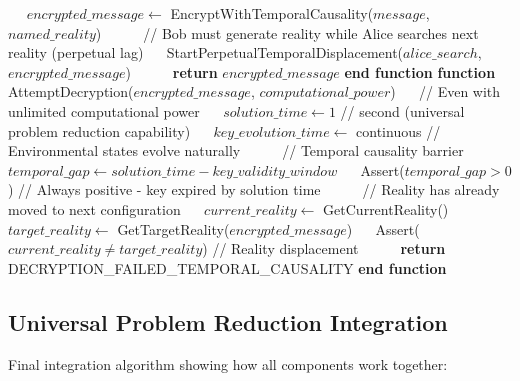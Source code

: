 \documentclass[12pt,a4paper]{article}
\theoremstyle{definition}
\begin{document}
{\begin{algorithm}
\begin{algorithmic}[1]
\STATE $\quad$ $encrypted\_message \leftarrow$ EncryptWithTemporalCausality($message$, $named\_reality$)
\STATE $\quad$
\STATE $\quad$ // Bob must generate reality while Alice searches next reality (perpetual lag)
\STATE $\quad$ StartPerpetualTemporalDisplacement($alice\_search$, $encrypted\_message$)
\STATE $\quad$
\STATE $\quad$ \textbf{return} $encrypted\_message$
\STATE \textbf{end function}
\STATE
\STATE \textbf{function} AttemptDecryption($encrypted\_message$, $computational\_power$)
\STATE $\quad$ // Even with unlimited computational power
\STATE $\quad$ $solution\_time \leftarrow 1$ // second (universal problem reduction capability)
\STATE $\quad$ $key\_evolution\_time \leftarrow$ continuous // Environmental states evolve naturally
\STATE $\quad$
\STATE $\quad$ // Temporal causality barrier
\STATE $\quad$ $temporal\_gap \leftarrow solution\_time - key\_validity\_window$
\STATE $\quad$ Assert($temporal\_gap > 0$) // Always positive - key expired by solution time
\STATE $\quad$
\STATE $\quad$ // Reality has already moved to next configuration
\STATE $\quad$ $current\_reality \leftarrow$ GetCurrentReality()
\STATE $\quad$ $target\_reality \leftarrow$ GetTargetReality($encrypted\_message$)
\STATE $\quad$ Assert($current\_reality \neq target\_reality$) // Reality displacement
\STATE $\quad$
\STATE $\quad$ \textbf{return} DECRYPTION\_FAILED\_TEMPORAL\_CAUSALITY
\STATE \textbf{end function}
\end{algorithmic}
\end{algorithm}

\subsection{Universal Problem Reduction Integration}

Final integration algorithm showing how all components work together:

}
\end{document}
